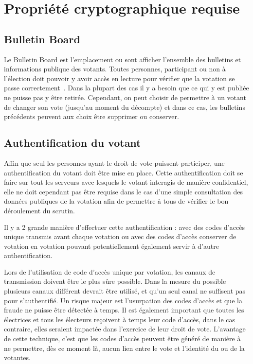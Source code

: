 \documentclass[../report]{subfiles}
\begin{document}
\chapter{Propriété cryptographique requise}
\section{Bulletin Board}

Le Bulletin Board est l'emplacement ou sont afficher l'ensemble des bulletins et informations publique des votants. 
Toutes personnes, participant ou non à l'élection doit pouvoir y avoir accès en lecture pour vérifier que la votation se passe correctement~\cite{gharadaghy_verifiability_2010}.
Dans la plupart des cas il y a besoin que ce qui y est publiée ne puisse pas y être retirée.
Cependant, on peut choisir de permettre à un votant de changer son vote (jusqu'au moment du décompte) et dans ce cas, les bulletins précédents 
peuvent aux choix être supprimer ou conserver.

\section{Authentification du votant}

Affin que seul les personnes ayant le droit de vote puissent participer, une authentification du votant doit être mise en place.
Cette authentification doit se faire sur tout les serveurs avec lesquels le votant interagis de manière confidentiel, elle ne doit
cependant pas être requise dans le cas d'une simple consultation des données publiques de la votation afin de permettre à tous de vérifier
le bon déroulement du scrutin.

Il y a 2 grande manière d'effectuer cette authentification : avec des codes d'accès unique transmis avant chaque votation ou avec des codes d'accès
conserver de votation en votation pouvant potentiellement également servir à d'autre authentification.

Lors de l'utilisation de code d'accès unique par votation, les canaux de transmission doivent être le plus sûre possible.
Dans la mesure du possible plusieurs canaux différent devrait être utilisé, et qu'un seul canal ne suffisent pas pour s'authentifié.
Un risque majeur est l'usurpation des codes d'accès et que la fraude ne puisse être détectée à temps.
Il est également important que toutes les électrices et tous les électeurs reçoivent à temps leur code d'accès, dans le cas contraire, elles 
seraient impactée dans l'exercice de leur droit de vote.
L'avantage de cette technique, c'est que les codes d'accès peuvent être généré de manière à ne permettre, dès ce moment là, aucun lien entre le vote
et l'identité du ou de la votantes.
\end{document}
